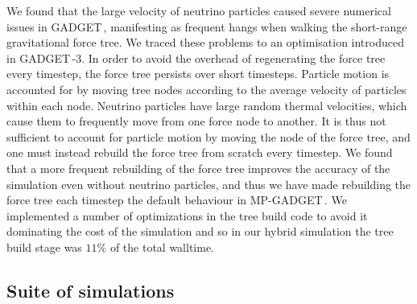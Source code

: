 \documentclass[useAMS, usenatbib]{mnras}
\newcommand{\gadget}{{\small GADGET\,}}
\begin{document}
We found that the large velocity of neutrino particles caused severe numerical issues in \gadget, manifesting as frequent hangs when walking the short-range gravitational force tree. We traced these problems to an optimisation introduced in \gadget-3. In order to avoid the overhead of regenerating the force tree every timestep, the force tree persists over short timesteps. Particle motion is accounted for by moving tree nodes according to the average velocity of particles within each node. Neutrino particles have large random thermal velocities, which cause them to frequently move from one force node to another. It is thus not sufficient to account for particle motion by moving the node of the force tree, and one must instead rebuild the force tree from scratch every timestep. We found that a more frequent rebuilding of the force tree improves the accuracy of the simulation even without neutrino particles, and thus we have made rebuilding the force tree each timestep the default behaviour in MP-\gadget. We implemented a number of optimizations in the tree build code to avoid it dominating the cost of the simulation and so in our hybrid simulation the tree build stage was $11\%$ of the total walltime.

\subsection{Suite of simulations}
\end{document}
